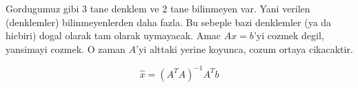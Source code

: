 \documentclass[12pt,fleqn]{article}\usepackage{../common}
\begin{document}
Gordugumuz gibi 3 tane denklem ve 2 tane bilinmeyen var. Yani verilen
(denklemler) bilinmeyenlerden daha fazla. Bu sebeple bazi denklemler (ya da
hicbiri) dogal olarak tam olarak uymayacak. Amac $Ax = b$'yi cozmek degil,
yansimayi cozmek. O zaman $A$'yi alttaki yerine koyunca, cozum ortaya
cikacaktir. 

\[ \hat{x} = (A^TA)^{-1}A^Tb \]
\end{document}
